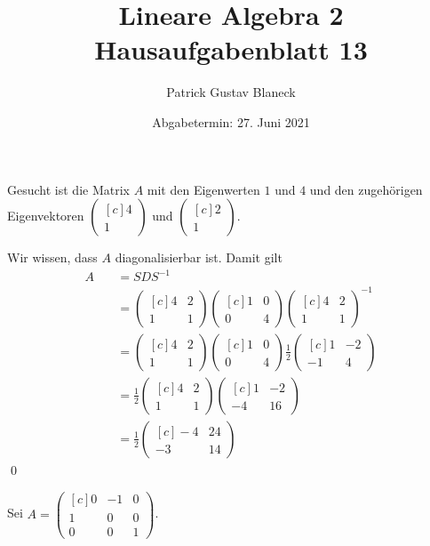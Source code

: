 \documentclass[answers]{exam}
\title{Lineare Algebra 2 \\ \large{Hausaufgabenblatt 13}}
\author{Patrick Gustav Blaneck}
\date{Abgabetermin: 27. Juni 2021}
\newcommand{\vektor}[1]{\begin{pmatrix*}[c] #1 \end{pmatrix*}}
\begin{document}
\maketitle
\begin{questions}
    \setcounter{question}{5}
    \question
    Gesucht ist die Matrix $A$ mit den Eigenwerten $1$ und $4$ und den zugehörigen Eigenvektoren $\vektor{4\\1}$ und $\vektor{2\\1}$.
    \begin{solution}
        Wir wissen, dass $A$ diagonalisierbar ist.
        Damit gilt
        $$
            \begin{aligned}
                A & \quad = SDS^{-1}                    \\
                  & \quad = \vektor{4              & 2  \\ 1 & 1} \vektor{1 & 0 \\ 0 & 4} \vektor{4 & 2 \\ 1 & 1}^{-1} \\
                  & \quad = \vektor{4              & 2  \\ 1 & 1} \vektor{1 & 0 \\ 0 & 4} \frac{1}{2} \vektor{1 & -2 \\ -1 & 4} \\
                  & \quad = \frac{1}{2} \vektor{4  & 2  \\ 1 & 1} \vektor{1 & -2 \\ -4 & 16} \\
                  & \quad = \frac{1}{2} \vektor{-4 & 24 \\ -3 & 14}
            \end{aligned}
        $$\qed
    \end{solution}

    \newpage
    \question
    Sei $A = \vektor{0 & -1 & 0 \\ 1 & 0 & 0 \\ 0 & 0 & 1}$.
\end{questions}
\end{document}
